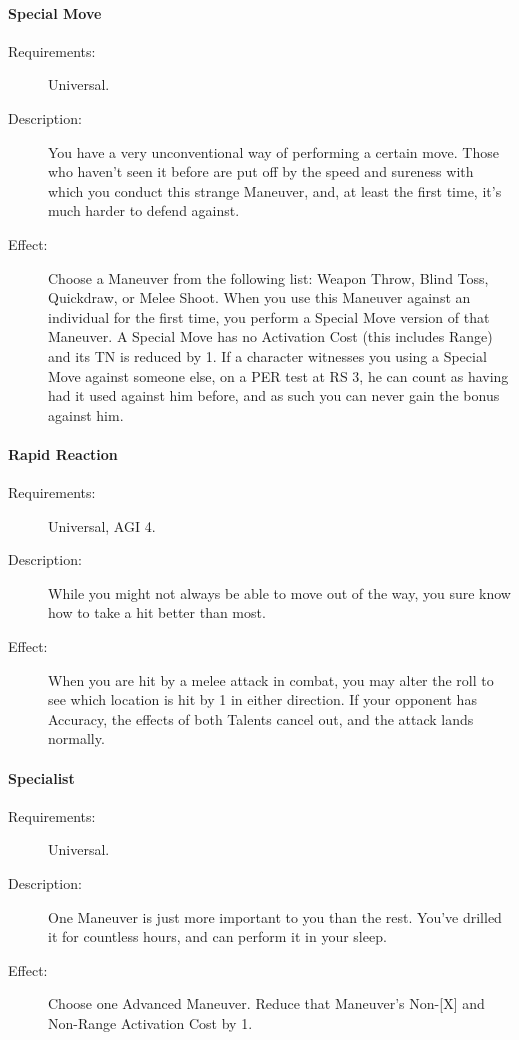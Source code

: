 \documentclass[oneside,11pt,english]{book}
\begin{document}
\paragraph{\label{talent:Special Move}Special Move}
\begin{description}
\item [Requirements:] Universal. 
\item [Description:] You have a very unconventional way of performing a certain move. Those who haven't seen 
  it before are put off by the speed and sureness with which you conduct this strange Maneuver, and, at 
  least the first time, it's much harder to defend against. 
\item [Effect:] Choose a Maneuver from the following list: Weapon Throw, Blind Toss, Quickdraw, or Melee Shoot. When you use this Maneuver against an individual for the first time, you perform a Special Move 
  version of that Maneuver. A Special Move has no Activation Cost (this includes Range) and its TN is 
  reduced by 1. If a character witnesses you using a Special Move against someone else, on a PER test at 
  RS 3, he can count as having had it used against him before, and as such you can never gain the bonus 
  against him. 
  
\end{description}
\paragraph{\label{talent:Rapid Reaction}Rapid Reaction}
\begin{description}
\item [Requirements:] Universal, AGI 4. 
\item [Description:] While you might not always be able to move out of the way, you sure know how to take a hit better than most. 
\item [Effect:] When you are hit by a melee attack in combat, you may alter the roll to see which location is hit by 1 in either direction. If your opponent has Accuracy, the effects of both Talents cancel out, and the 
  attack lands normally. 
  
  
\end{description}
\paragraph{Specialist}\label{talent:Specialist}
\begin{description}
\item [Requirements:] Universal.
\item [Description:] One Maneuver is just more important to you than the rest. You’ve drilled it for countless hours, and can perform it in your sleep. 
\item [Effect:] Choose one Advanced Maneuver. Reduce that Maneuver’s Non-[X] and Non-Range Activation Cost by 1.
\end{description}
\end{document}
